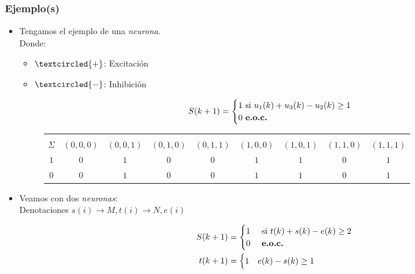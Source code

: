 \subsubsection{Ejemplo(s)}
\begin{itemize}
\item Tengamos el ejemplo de una \textit{neurona}. \\
Donde:
\begin{itemize}
\item $\textcircled{{\scriptsize +}}$: Excitación
\item $\textcircled{-}$: Inhibición
\end{itemize}
\begin{figure}[ht!]
\centering
{}
\end{figure}
$$S(k+1)=
\begin{cases}
1 \text{ si } u_1(k) +u_3(k) - u_2(k) \geq 1 \\
0 \text{ \textbf{e.o.c.} }
\end{cases}
$$
\begin{figure}[ht!]
\centering
\begin{tabular}{|c|cccccccc|}
    \hline
    \backslashbox{$k$}{\vspace{0.1pt}\\$\Sigma$} & $(0,0,0)$ & $(0,0,1)$ & $(0,1,0)$ & $(0,1,1)$ & $(1,0,0)$ & $(1,0,1)$ & $(1,1,0)$ & $(1,1,1)$\\ \hline
                $1$ & $0$ & $1$  & $0$ & $0$ & $1$ & $1$ & $0$ & $1$ \\ 
                $0$ & $0$ & $1$  & $0$ & $0$ & $1$ & $1$ & $0$ & $1$ \\ \hline
\end{tabular} 
\end{figure}
\item Veamos con dos \textit{neuronas}: \\
Denotaciones $s(i) \rightarrow M , t(i) \rightarrow N,e(i)$
\begin{figure}[ht!]
\centering
{}
\end{figure}
\begin{align*}
S(k+1) &=  
\begin{cases}
1 & \text{ si } t(k) +s(k) - e(k) \geq 2 \\
0 & \text{ \textbf{e.o.c.} }
\end{cases} \\
t(k+1) &=
\begin{cases}
1 & e(k)-s(k) \geq 1 \\

\end{cases}
\end{align*}
\end{itemize}

